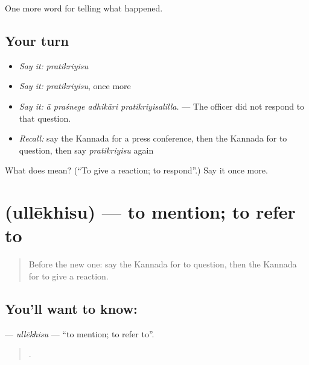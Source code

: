 \begin{grammarlens}[title={What you've built}]
One more word for telling what happened.
\end{grammarlens}

\subsection*{Your turn}
\begin{itemize}
\raggedright
  \item \emph{Say it:} \emph{pratikriyisu}
  \item \emph{Say it:} \emph{pratikriyisu}, once more
  \item \emph{Say it:} \emph{ā praśnege adhikāri pratikriyisalilla.} — The officer did not respond to that question.
  \item \emph{Recall:} say the Kannada for a press conference, then the Kannada for to question, then say \emph{pratikriyisu} again
\end{itemize}

\begin{tcolorbox}[breakable,colback=teal!4,colframe=teal!35!black,title={Before you move on}]
What does  mean? (\textquotedblleft{}To give a reaction; to respond\textquotedblright{}.) Say it once more.
\end{tcolorbox}
\section[\texorpdfstring{\kn{ಉಲ್ಲೇಖಿಸು} (ullēkhisu)}{ಉಲ್ಲೇಖಿಸು (ullēkhisu)}]{ (ullēkhisu) — to mention; to refer to}

\label{lesson:KA-C347-ullekhisu}



\begin{quote}
Before the new one: say the Kannada for to question, then the Kannada for to give a reaction.
\end{quote}

\subsection*{You'll want to know: }
\textbf{} — \emph{ullēkhisu} — \textquotedblleft{}to mention; to refer to\textquotedblright{}.

\begin{quote}
    .
\end{quote}

